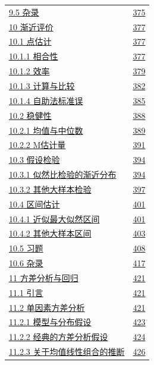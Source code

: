 \begin{longtable}{@{}p{}r@{}}
\hyperref[sec:9.5]{9.5 杂录} & \hyperref[sec:9.5]{375} \\
\hyperref[sec:10]{10 渐近评价} & \hyperref[sec:10]{377} \\
\hyperref[sec:10.1]{10.1 点估计} & \hyperref[sec:10.1]{377} \\
\hyperref[sec:10.1.1]{10.1.1 相合性} & \hyperref[sec:10.1.1]{377} \\
\hyperref[sec:10.1.2]{10.1.2 效率} & \hyperref[sec:10.1.2]{379} \\
\hyperref[sec:10.1.3]{10.1.3 计算与比较} & \hyperref[sec:10.1.3]{382} \\
\hyperref[sec:10.1.4]{10.1.4 自助法标准误} & \hyperref[sec:10.1.4]{385} \\
\hyperref[sec:10.2]{10.2 稳健性} & \hyperref[sec:10.2]{388} \\
\hyperref[sec:10.2.1]{10.2.1 均值与中位数} & \hyperref[sec:10.2.1]{389} \\
\hyperref[sec:10.2.2]{10.2.2 M估计量} & \hyperref[sec:10.2.2]{391} \\
\hyperref[sec:10.3]{10.3 假设检验} & \hyperref[sec:10.3]{394} \\
\hyperref[sec:10.3.1]{10.3.1 似然比检验的渐近分布} & \hyperref[sec:10.3.1]{394} \\
\hyperref[sec:10.3.2]{10.3.2 其他大样本检验} & \hyperref[sec:10.3.2]{397} \\
\hyperref[sec:10.4]{10.4 区间估计} & \hyperref[sec:10.4]{401} \\
\hyperref[sec:10.4.1]{10.4.1 近似最大似然区间} & \hyperref[sec:10.4.1]{401} \\
\hyperref[sec:10.4.2]{10.4.2 其他大样本区间} & \hyperref[sec:10.4.2]{403} \\
\hyperref[sec:10.5]{10.5 习题} & \hyperref[sec:10.5]{408} \\
\hyperref[sec:10.6]{10.6 杂录} & \hyperref[sec:10.6]{417} \\
\hyperref[sec:11]{11 方差分析与回归} & \hyperref[sec:11]{421} \\
\hyperref[sec:11.1]{11.1 引言} & \hyperref[sec:11.1]{421} \\
\hyperref[sec:11.2]{11.2 单因素方差分析} & \hyperref[sec:11.2]{421} \\
\hyperref[sec:11.2.1]{11.2.1 模型与分布假设} & \hyperref[sec:11.2.1]{423} \\
\hyperref[sec:11.2.2]{11.2.2 经典的方差分析假设} & \hyperref[sec:11.2.2]{424} \\
\hyperref[sec:11.2.3]{11.2.3 关于均值线性组合的推断} & \hyperref[sec:11.2.3]{426} \\

\end{longtable}
